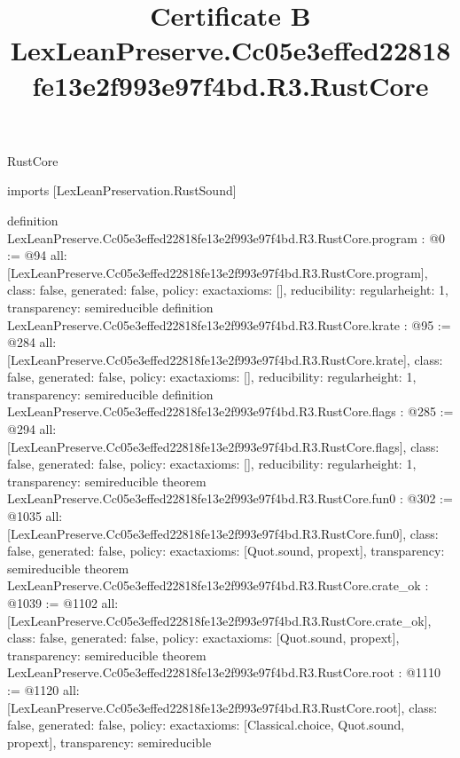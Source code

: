 \begin{lexlean}{RustCore}
\title{Certificate B LexLeanPreserve.Cc05e3effed22818fe13e2f993e97f4bd.R3.RustCore}
\begin{coremodule}
imports [LexLeanPreservation.RustSound]

definition LexLeanPreserve.Cc05e3effed22818fe13e2f993e97f4bd.R3.RustCore.program : @0 := @94 {
  all: [LexLeanPreserve.Cc05e3effed22818fe13e2f993e97f4bd.R3.RustCore.program],
  class: false,
  generated: false,
  policy: exact{axioms: []},
  reducibility: regular{height: 1},
  transparency: semireducible
}
definition LexLeanPreserve.Cc05e3effed22818fe13e2f993e97f4bd.R3.RustCore.krate : @95 := @284 {
  all: [LexLeanPreserve.Cc05e3effed22818fe13e2f993e97f4bd.R3.RustCore.krate],
  class: false,
  generated: false,
  policy: exact{axioms: []},
  reducibility: regular{height: 1},
  transparency: semireducible
}
definition LexLeanPreserve.Cc05e3effed22818fe13e2f993e97f4bd.R3.RustCore.flags : @285 := @294 {
  all: [LexLeanPreserve.Cc05e3effed22818fe13e2f993e97f4bd.R3.RustCore.flags],
  class: false,
  generated: false,
  policy: exact{axioms: []},
  reducibility: regular{height: 1},
  transparency: semireducible
}
theorem LexLeanPreserve.Cc05e3effed22818fe13e2f993e97f4bd.R3.RustCore.fun0 : @302 := @1035 {
  all: [LexLeanPreserve.Cc05e3effed22818fe13e2f993e97f4bd.R3.RustCore.fun0],
  class: false,
  generated: false,
  policy: exact{axioms: [Quot.sound, propext]},
  transparency: semireducible
}
theorem LexLeanPreserve.Cc05e3effed22818fe13e2f993e97f4bd.R3.RustCore.crate_ok : @1039 := @1102 {
  all: [LexLeanPreserve.Cc05e3effed22818fe13e2f993e97f4bd.R3.RustCore.crate_ok],
  class: false,
  generated: false,
  policy: exact{axioms: [Quot.sound, propext]},
  transparency: semireducible
}
theorem LexLeanPreserve.Cc05e3effed22818fe13e2f993e97f4bd.R3.RustCore.root : @1110 := @1120 {
  all: [LexLeanPreserve.Cc05e3effed22818fe13e2f993e97f4bd.R3.RustCore.root],
  class: false,
  generated: false,
  policy: exact{axioms: [Classical.choice, Quot.sound, propext]},
  transparency: semireducible
}


\end{coremodule}
\end{lexlean}

